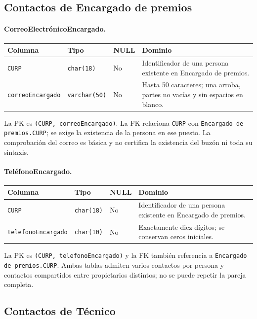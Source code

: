 \clearpage
\subsection{Contactos de Encargado de premios}

\paragraph{CorreoElectrónicoEncargado.}
\noindent\begin{tabular}{@{}p{}p{}p{}p{}@{}}
\hline
\textbf{Columna} & \textbf{Tipo} & \textbf{NULL} & \textbf{Dominio} \\
\hline
\texttt{CURP} & \texttt{char(18)} & No & Identificador de una persona existente en Encargado de premios. \\
\texttt{correoEncargado} & \texttt{varchar(50)} & No & Hasta 50 caracteres; una arroba, partes no vacías y sin espacios en blanco. \\
\hline
\end{tabular}

La PK es \texttt{(CURP, correoEncargado)}. La FK relaciona
\texttt{CURP} con \texttt{Encargado de premios.CURP}; se exige la existencia de
la persona en ese puesto. La comprobación del correo es básica y no
certifica la existencia del buzón ni toda su sintaxis.

\paragraph{TeléfonoEncargado.}
\noindent\begin{tabular}{@{}p{}p{}p{}p{}@{}}
\hline
\textbf{Columna} & \textbf{Tipo} & \textbf{NULL} & \textbf{Dominio} \\
\hline
\texttt{CURP} & \texttt{char(18)} & No & Identificador de una persona existente en Encargado de premios. \\
\texttt{telefonoEncargado} & \texttt{char(10)} & No & Exactamente diez dígitos; se conservan ceros iniciales. \\
\hline
\end{tabular}

La PK es \texttt{(CURP, telefonoEncargado)} y la FK también referencia
a \texttt{Encargado de premios.CURP}. Ambas tablas admiten varios contactos por
persona y contactos compartidos entre propietarios distintos; no se
puede repetir la pareja completa.

\subsection{Contactos de Técnico}

